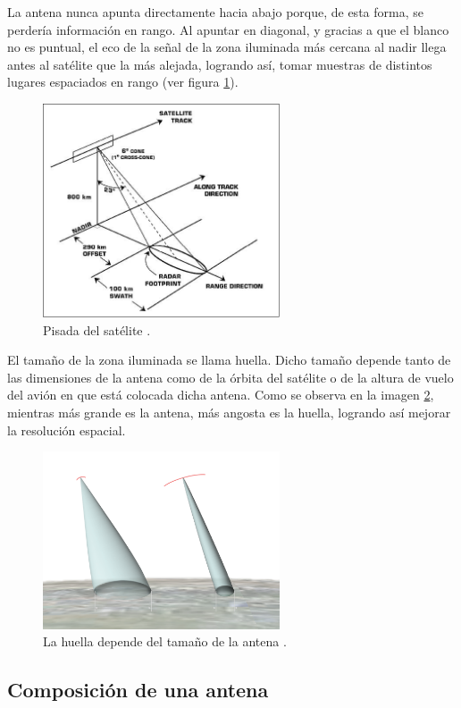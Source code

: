 La antena nunca apunta directamente hacia abajo porque, de esta forma, se perdería información en rango. Al apuntar
en diagonal, y gracias a que el blanco no es puntual, el eco de la señal de la zona iluminada más cercana al nadir llega
antes al satélite que la más alejada, logrando así, tomar muestras de distintos lugares espaciados en rango (ver figura
\ref{fig:antenna_ilumination}).

\begin{figure}[H]
 \centering
 \includegraphics[width=7cm]{gfx/satellite.png}
 \caption{Pisada del satélite \cite{FootprintSatellite}.}
 \label{fig:antenna_ilumination}
\end{figure}

El tamaño de la zona iluminada se llama huella. Dicho tamaño depende tanto de las dimensiones de la antena como de la
órbita del satélite o de la altura de vuelo del avión en que está colocada dicha antena. Como se observa en la imagen
\ref{fig:footprint}, mientras más grande es la antena, más angosta es la huella, logrando así mejorar la resolución
espacial.

\begin{figure}[H]
 \centering
 \includegraphics[width=7cm]{gfx/footprint.png}
 \caption{La huella depende del tamaño de la antena \cite{FootprintAntenna}.}
 \label{fig:footprint}
\end{figure}

\subsection{Composición de una antena}

